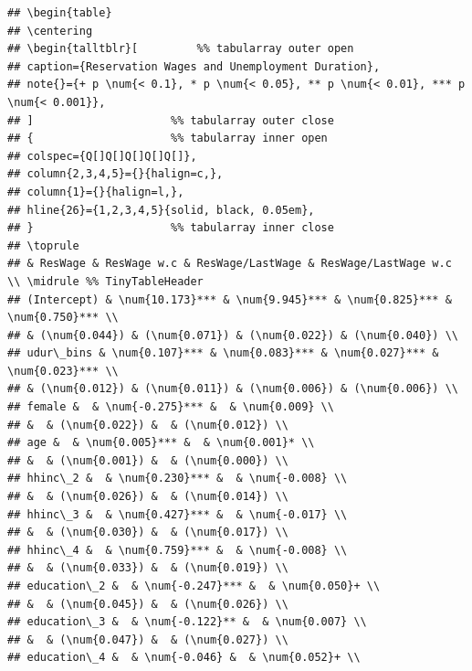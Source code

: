 \documentclass[
]{article}
\begin{document}
\begin{verbatim}
## \begin{table}
## \centering
## \begin{talltblr}[         %% tabularray outer open
## caption={Reservation Wages and Unemployment Duration},
## note{}={+ p \num{< 0.1}, * p \num{< 0.05}, ** p \num{< 0.01}, *** p \num{< 0.001}},
## ]                     %% tabularray outer close
## {                     %% tabularray inner open
## colspec={Q[]Q[]Q[]Q[]Q[]},
## column{2,3,4,5}={}{halign=c,},
## column{1}={}{halign=l,},
## hline{26}={1,2,3,4,5}{solid, black, 0.05em},
## }                     %% tabularray inner close
## \toprule
## & ResWage & ResWage w.c & ResWage/LastWage & ResWage/LastWage w.c \\ \midrule %% TinyTableHeader
## (Intercept) & \num{10.173}*** & \num{9.945}*** & \num{0.825}*** & \num{0.750}*** \\
## & (\num{0.044}) & (\num{0.071}) & (\num{0.022}) & (\num{0.040}) \\
## udur\_bins & \num{0.107}*** & \num{0.083}*** & \num{0.027}*** & \num{0.023}*** \\
## & (\num{0.012}) & (\num{0.011}) & (\num{0.006}) & (\num{0.006}) \\
## female &  & \num{-0.275}*** &  & \num{0.009} \\
## &  & (\num{0.022}) &  & (\num{0.012}) \\
## age &  & \num{0.005}*** &  & \num{0.001}* \\
## &  & (\num{0.001}) &  & (\num{0.000}) \\
## hhinc\_2 &  & \num{0.230}*** &  & \num{-0.008} \\
## &  & (\num{0.026}) &  & (\num{0.014}) \\
## hhinc\_3 &  & \num{0.427}*** &  & \num{-0.017} \\
## &  & (\num{0.030}) &  & (\num{0.017}) \\
## hhinc\_4 &  & \num{0.759}*** &  & \num{-0.008} \\
## &  & (\num{0.033}) &  & (\num{0.019}) \\
## education\_2 &  & \num{-0.247}*** &  & \num{0.050}+ \\
## &  & (\num{0.045}) &  & (\num{0.026}) \\
## education\_3 &  & \num{-0.122}** &  & \num{0.007} \\
## &  & (\num{0.047}) &  & (\num{0.027}) \\
## education\_4 &  & \num{-0.046} &  & \num{0.052}+ \\

\end{verbatim}
\end{document}
